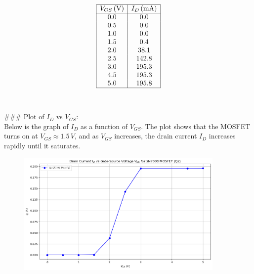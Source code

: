 \documentclass{article}
\begin{document}
\[
\begin{array}{|c|c|}
\hline
V_{GS} \, (\text{V}) & I_D \, (\text{mA}) \\
\hline
0.0 & 0.0 \\
0.5 & 0.0 \\
1.0 & 0.0 \\
1.5 & 0.4 \\
2.0 & 38.1 \\
2.5 & 142.8 \\
3.0 & 195.3 \\
4.5 & 195.3 \\
5.0 & 195.8 \\
\hline
\end{array}
\]
\\ \\
### Plot of \( I_D \) vs \( V_{GS} \): \\ 
Below is the graph of \( I_D \) as a function of \( V_{GS} \). The plot shows that the MOSFET turns on at \( V_{GS} \approx 1.5 \, V \), and as \( V_{GS} \) increases, the drain current \( I_D \) increases rapidly until it saturates.

\begin{figure}[H]
    \centering
    \includegraphics[width=0.9\textwidth]{./img/Lab6_2_IdVSVgs.png}
    \caption{}
    \label{fig:graph1} 
\end{figure}
\end{document}
